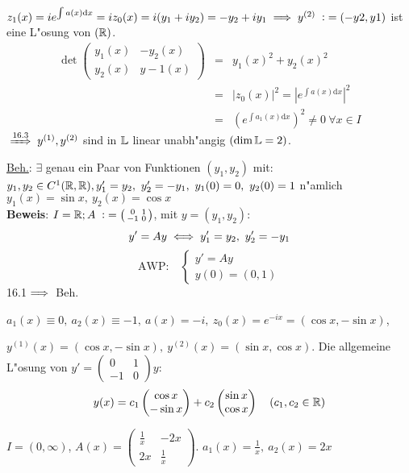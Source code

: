 \documentclass{article}
\begin{document}
$z_1(x)=ie^{\int a(x)\text{d}x}=iz_0(x)=i(y_1+iy_2)=-y_2+iy_1\folgt y^{(2)}\da (-y2, y1)$ ist eine L"osung von $(\mathbb{R})$.\\
\begin{eqnarray*}
	\det\begin{pmatrix}
		y_1(x) & -y_2(x)\\
		y_2(x) & y-1(x)
	\end{pmatrix}&=&y_1(x)^2+y_2(x)^2\\
	&=&|z_0(x)|^2=|e^{\int a(x)\text{d}x}|^2\\
	&=&\left(e^{\int a_1(x)\text{d}x}\right)^2\ne 0\ \forall x\in I
\end{eqnarray*}
$\folgtnach{16.3} y^{(1)}, y^{(2)}$ sind in $\mathbb{L}$ linear unabh"angig $(\dim\mathbb{L}=2)$.
\begin{beispiele}
\item \underline{Beh.}: $\exists$ genau ein Paar von Funktionen $(y_1, y_2)$ mit: $y_1, y_2\in C^1(\MdR,\MdR), y_1'=y_2,\ y_2'=-y_1,\ y_1(0)=0,\ y_2(0)=1$ n"amlich $y_1(x)=\sin x,\ y_2(x)=\cos x$\\

\textbf{Beweis}: $I=\MdR; A\da \left(\begin{smallmatrix}0&1\\-1&0\end{smallmatrix}\right)$, mit $y=(y_1, y_2):$
\[
	y'=Ay\iff y_1'=y_2,\ y_2'=-y_1
\]
\[
	\text{AWP:}\quad\begin{cases}
		y'=Ay\\
		y(0)=(0,1)
	\end{cases}
\]
16.1$\implies$ Beh.

$a_1(x)\equiv 0,\ a_2(x)\equiv -1,\ a(x)=-i,\ z_0(x)=e^{-ix}=(\cos x, -\sin x)$,

$y^{(1)}(x)=(\cos x, -\sin x),\ y^{(2)}(x)=(\sin x, \cos x)$. Die allgemeine L"osung von $y'=\left(\begin{smallmatrix}0&1\\-1&0\end{smallmatrix}\right)y:$
\[
	y(x)=c_1\begin{pmatrix}\cos x \\-\sin x\end{pmatrix}+c_2\begin{pmatrix}\sin x\\ \cos x\end{pmatrix}\quad (c_1, c_2\in\mathbb{R})
\]
\item $I=(0,\infty)$, $A(x)=\begin{pmatrix}\frac{1}{x}&-2x\\ 2x&\frac{1}{x}\end{pmatrix}$.
$a_1(x)=\frac{1}{x},\ a_2(x)=2x$


\end{beispiele}
\end{document}
